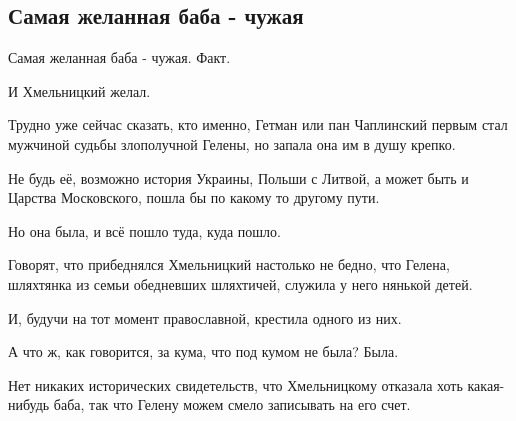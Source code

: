  
 
 

\subsection{Самая желанная баба - чужая}


Самая желанная баба - чужая.
Факт.

И Хмельницкий желал.

Трудно уже сейчас сказать, кто именно, Гетман или пан Чаплинский первым стал
мужчиной судьбы злополучной Гелены, но запала она им в душу крепко.

Не будь её, возможно история Украины, Польши с Литвой, а может быть и Царства
Московского, пошла бы по какому то другому пути.

Но она была, и всё пошло туда, куда пошло.

Говорят, что прибеднялся Хмельницкий настолько не бедно, что Гелена, шляхтянка
из семьи обедневших шляхтичей, служила у него нянькой детей.

И, будучи на тот момент православной, крестила одного из них.

А что ж, как говорится, за кума, что под кумом не была?
Была.

Нет никаких исторических свидетельств, что Хмельницкому отказала хоть
какая-нибудь баба, так что Гелену можем смело записывать на его счет.

